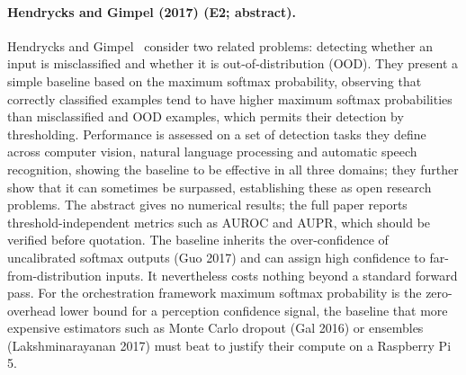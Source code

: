 \documentclass[10pt,a4paper]{article}
\begin{document}
\paragraph{Hendrycks and Gimpel (2017) (E2; abstract).} Hendrycks and Gimpel~\cite{Hendrycks2017} consider two related problems: detecting whether an input is misclassified and whether it is out-of-distribution (OOD). They present a simple baseline based on the maximum softmax probability, observing that correctly classified examples tend to have higher maximum softmax probabilities than misclassified and OOD examples, which permits their detection by thresholding. Performance is assessed on a set of detection tasks they define across computer vision, natural language processing and automatic speech recognition, showing the baseline to be effective in all three domains; they further show that it can sometimes be surpassed, establishing these as open research problems. The abstract gives no numerical results; the full paper reports threshold-independent metrics such as AUROC and AUPR, which should be verified before quotation. The baseline inherits the over-confidence of uncalibrated softmax outputs (Guo 2017) and can assign high confidence to far-from-distribution inputs. It nevertheless costs nothing beyond a standard forward pass. For the orchestration framework maximum softmax probability is the zero-overhead lower bound for a perception confidence signal, the baseline that more expensive estimators such as Monte Carlo dropout (Gal 2016) or ensembles (Lakshminarayanan 2017) must beat to justify their compute on a Raspberry Pi 5.
\end{document}
